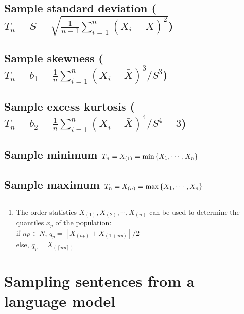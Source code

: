 \subsection{Sample standard deviation ($T_n = S = \sqrt{\frac{1}{n-1}\sum_{i=1}^{n} (X_i - \bar{X})^2}$) \cite{ism-1}}

\subsection{Sample skewness ($T_n = b_1 = \frac{1}{n} \sum_{i=1}^{n} (X_i - \bar{X})^3/S^3 $) \cite{ism-1}}

\subsection{Sample excess kurtosis ($T_n = b_2 = \frac{1}{n} \sum_{i=1}^{n} (X_i - \bar{X})^4/S^4 -3$) \cite{ism-1}}

\subsection{Sample minimum $T_n = X_{(1)} = \min\left\{X_1,\cdots,X_n\right\}$ \cite{ism-1}}

\subsection{Sample maximum $T_n = X_{(n)} = \max\left\{X_1,\cdots,X_n\right\}$ \cite{ism-1}}

\subsection*{}

\begin{enumerate}
    \item The order statistics $X_{(1)}, X_{(2)},\cdots, X_{(n)}$ can be used to determine the quantiles $x_p$ of the population:\\
    if $np \in N$, $q_p = [X_{(np)} + X_{(1+np)}]/2$\\
    else, $q_p = X_{( \left \lceil np \right \rceil)}$
\end{enumerate}


\section{Sampling sentences from a language model \cite{nlp-1}}\label{Sampling sentences from a language model}

